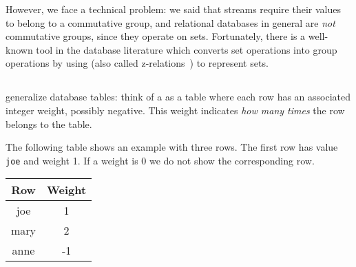 However, we face a technical problem: we said that streams require
their values to belong to a commutative group, and relational
databases in general are \emph{not} commutative groups, since they
operate on sets.  Fortunately, there is a well-known tool in the
database literature which converts set operations into group
operations by using \zrs (also called z-relations~\cite{green-tcs11})
to represent sets.

\subsection{\zrs}

\zrs generalize database tables: think of a \zr as a table where each
row has an associated integer weight, possibly negative.  This weight
indicates \emph{how many times} the row belongs to the table.

%


The following table shows an example \zr with three rows.  The first
row has value \texttt{joe} and weight 1.  If a weight is 0 we do not
show the corresponding row.
%
\begin{center}
\begin{tabular}{|c|c|}\hline
  Row & Weight \\ \hline
  joe & 1 \\
  mary & 2 \\
  anne & -1 \\ \hline
\end{tabular}
\end{center}

